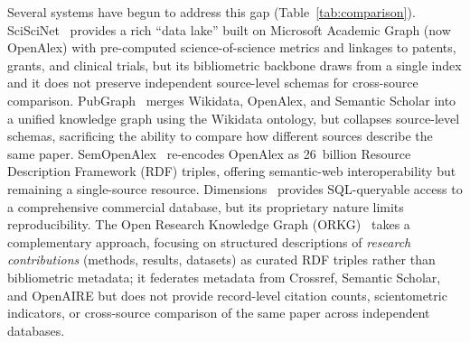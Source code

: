 Several systems have begun to address this gap (Table~\ref{tab:comparison}).
SciSciNet~\cite{lin2023sciscinet} provides a rich ``data lake'' built on
Microsoft Academic Graph (now OpenAlex) with pre-computed science-of-science
metrics and linkages to patents, grants, and clinical trials, but its
bibliometric backbone draws from a single index and it does not preserve
independent source-level schemas for cross-source comparison.
PubGraph~\cite{ahrabian2023pubgraph} merges Wikidata, OpenAlex, and Semantic
Scholar into a unified knowledge graph using the Wikidata ontology, but
collapses source-level schemas, sacrificing the ability to compare how different
sources describe the same paper. SemOpenAlex~\cite{farber2023semopenalex}
re-encodes OpenAlex as 26~billion Resource Description Framework (RDF)
triples, offering semantic-web
interoperability but remaining a single-source resource.
Dimensions~\cite{hook2018dimensions} provides SQL-queryable access to a
comprehensive commercial database, but its proprietary nature limits
reproducibility. The Open Research Knowledge Graph
(ORKG)~\cite{jaradeh2019orkg} takes a complementary approach, focusing on
structured descriptions of \emph{research contributions} (methods, results,
datasets) as curated RDF triples rather than bibliometric metadata; it
federates metadata from Crossref, Semantic Scholar, and OpenAIRE but does
not provide record-level citation counts, scientometric indicators, or
cross-source comparison of the same paper across independent databases.

